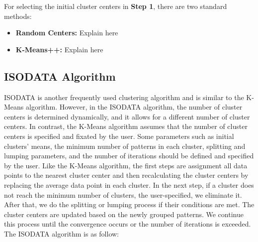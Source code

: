 \documentclass[twoside,twocolumn]{article}
\begin{document}
For selecting the initial cluster centers in \textbf{Step 1}, there are two
standard methods:

\begin{itemize}
\item \textbf{Random Centers:} Explain here %
\item \textbf{K-Means++:} Explain here %
\end{itemize}


\subsection{ISODATA Algorithm}

ISODATA is another frequently used clustering algorithm and is similar to the
K-Means algorithm. However, in the ISODATA algorithm, the number of cluster
centers is determined dynamically, and it allows for a different number of
cluster centers. In contrast, the K-Means algorithm assumes that the number of
cluster centers is specified and fixated by the user. Some parameters such as
initial clusters' means, the minimum number of patterns in each cluster,
splitting and lumping parameters, and the number of iterations should be defined
and specified by the user. Like the K-Means algorithm, the first steps are
assignment all data points to the nearest cluster center and then recalculating
the cluster centers by replacing the average data point in each cluster. In the
next step, if a cluster does not reach the minimum number of clusters, the
user-specified, we eliminate it. After that, we do the splitting or lumping
process if their conditions are met. The cluster centers are updated based on
the newly grouped patterns. We continue this process until the convergence
occurs or the number of iterations is exceeded. The ISODATA algorithm is as
follow: 
\end{document}

